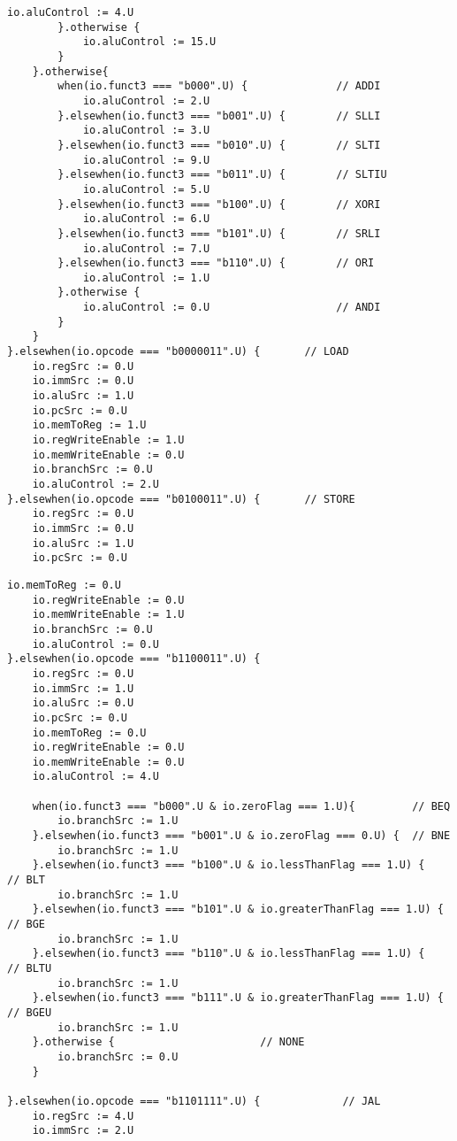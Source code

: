 \documentclass[12pt, letterpaper]{report}
\begin{document}
\noindent\begin{lstlisting}[style=scala]
    		io.aluControl := 4.U
    	}.otherwise {
    		io.aluControl := 15.U
    	}
    }.otherwise{
    	when(io.funct3 === "b000".U) {              // ADDI
    		io.aluControl := 2.U
    	}.elsewhen(io.funct3 === "b001".U) {        // SLLI
    		io.aluControl := 3.U
    	}.elsewhen(io.funct3 === "b010".U) {        // SLTI
    		io.aluControl := 9.U
    	}.elsewhen(io.funct3 === "b011".U) {        // SLTIU
    		io.aluControl := 5.U
    	}.elsewhen(io.funct3 === "b100".U) {        // XORI
    		io.aluControl := 6.U
    	}.elsewhen(io.funct3 === "b101".U) {        // SRLI
    		io.aluControl := 7.U
    	}.elsewhen(io.funct3 === "b110".U) {        // ORI
    		io.aluControl := 1.U
    	}.otherwise {
    		io.aluControl := 0.U                    // ANDI
    	}
    }
}.elsewhen(io.opcode === "b0000011".U) {       // LOAD
    io.regSrc := 0.U
    io.immSrc := 0.U
    io.aluSrc := 1.U
    io.pcSrc := 0.U
    io.memToReg := 1.U
    io.regWriteEnable := 1.U
    io.memWriteEnable := 0.U
    io.branchSrc := 0.U
    io.aluControl := 2.U
}.elsewhen(io.opcode === "b0100011".U) {       // STORE
    io.regSrc := 0.U
    io.immSrc := 0.U
    io.aluSrc := 1.U
    io.pcSrc := 0.U
\end{lstlisting}
\noindent\begin{lstlisting}[style=scala]
    io.memToReg := 0.U
    io.regWriteEnable := 0.U
    io.memWriteEnable := 1.U
    io.branchSrc := 0.U
    io.aluControl := 0.U
}.elsewhen(io.opcode === "b1100011".U) {
    io.regSrc := 0.U
    io.immSrc := 1.U
    io.aluSrc := 0.U
    io.pcSrc := 0.U
    io.memToReg := 0.U
    io.regWriteEnable := 0.U
    io.memWriteEnable := 0.U
    io.aluControl := 4.U
    
    when(io.funct3 === "b000".U & io.zeroFlag === 1.U){         // BEQ
    	io.branchSrc := 1.U
    }.elsewhen(io.funct3 === "b001".U & io.zeroFlag === 0.U) {  // BNE
    	io.branchSrc := 1.U
    }.elsewhen(io.funct3 === "b100".U & io.lessThanFlag === 1.U) {    // BLT
    	io.branchSrc := 1.U
    }.elsewhen(io.funct3 === "b101".U & io.greaterThanFlag === 1.U) {    // BGE
    	io.branchSrc := 1.U
    }.elsewhen(io.funct3 === "b110".U & io.lessThanFlag === 1.U) {    // BLTU
    	io.branchSrc := 1.U
    }.elsewhen(io.funct3 === "b111".U & io.greaterThanFlag === 1.U) {    // BGEU
    	io.branchSrc := 1.U
    }.otherwise {                       // NONE
    	io.branchSrc := 0.U
    }
    
}.elsewhen(io.opcode === "b1101111".U) {             // JAL
    io.regSrc := 4.U
    io.immSrc := 2.U
\end{lstlisting}
\end{document}
